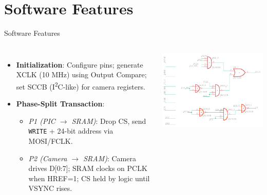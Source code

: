 \documentclass{beamer}
\begin{document}
\section{Software Features}
\begin{frame}{Software Features}
  \begin{columns}
\begin{itemize}
  \item \textbf{Initialization}: Configure pins; generate XCLK (10 MHz) using Output Compare; set SCCB (I\textsuperscript{2}C-like) for camera registers.
  \item \textbf{Phase-Split Transaction}:
        \begin{itemize}
          \item \textit{P1 (PIC $\rightarrow$ SRAM)}: Drop CS, send \texttt{WRITE} + 24-bit address via MOSI/FCLK.
          \item \textit{P2 (Camera $\rightarrow$ SRAM)}: Camera drives D[0:7]; SRAM clocks on PCLK when HREF=1; CS held by logic until VSYNC rises.
        \end{itemize}
\end{itemize}
\includegraphics[width=\textwidth]{ControlClockHardware.png}
\end{columns}
\end{frame}
\end{document}

